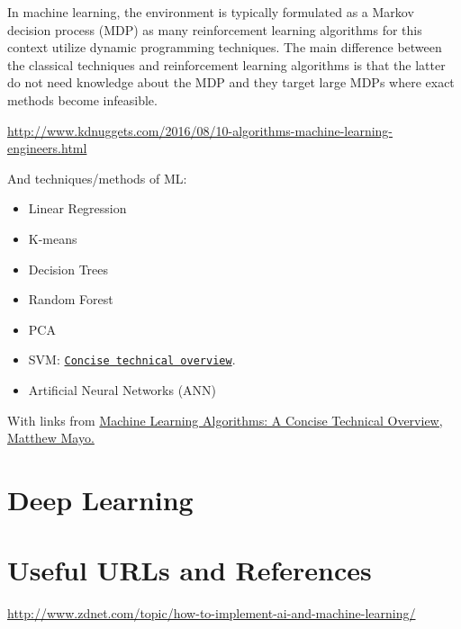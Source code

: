 \documentclass[11pt]{article}
\begin{document}
In machine learning, the environment is typically formulated as a
Markov decision process (MDP) as many reinforcement learning
algorithms for this context utilize dynamic programming
techniques. The main difference between the classical techniques and
reinforcement learning algorithms is that the latter do not need
knowledge about the MDP and they target large MDPs where exact methods
become infeasible.


\smallskip \smallskip
\noindent
\href{http://www.kdnuggets.com/2016/08/10-algorithms-machine-learning-engineers.html}{http://www.kdnuggets.com/2016/08/10-algorithms-machine-learning-engineers.html}


And techniques/methods of ML:
\begin{itemize}
\item{Linear Regression}
\item{K-means} 
\item{Decision Trees}
\item{Random Forest}
\item{PCA}
\item{SVM: 
\href{http://www.kdnuggets.com/2016/09/support-vector-machines-concise-technical-overview.html}{\tt Concise technical overview}. } 
\item{Artificial Neural Networks (ANN)}
\end{itemize}

With links from
\href{https://www.linkedin.com/pulse/machine-learning-algorithms-concise-technical-overview-matthew-mayo}{Machine
Learning Algorithms: A Concise Technical Overview, Matthew Mayo.}


\section{Deep Learning}


































\section{Useful URLs and References}
\href{http://www.zdnet.com/topic/how-to-implement-ai-and-machine-learning/}{http://www.zdnet.com/topic/how-to-implement-ai-and-machine-learning/}\\

















\end{document}
